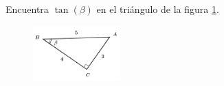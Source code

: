 \question[15] Encuentra $\tan(\beta)$ en el triángulo de la figura \ref{fig:functrig15}.
\begin{figure}[H]
    \begin{center}
        \includegraphics[width=0.3\textwidth]{../images/functrig15.png}
    \end{center}
    \caption{}
    \label{fig:functrig15}
\end{figure}

